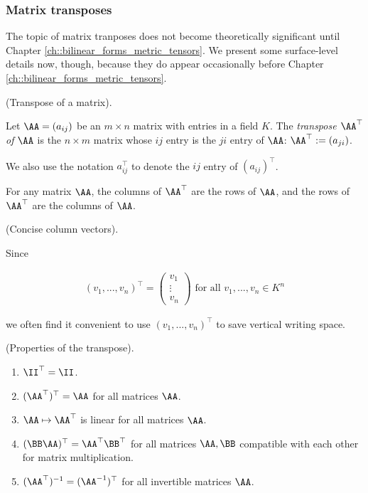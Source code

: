 \subsubsection{Matrix transposes}

The topic of matrix tranposes does not become theoretically significant until Chapter \ref{ch::bilinear_forms_metric_tensors}. We present some surface-level details now, though, because they do appear occasionally before Chapter \ref{ch::bilinear_forms_metric_tensors}.

\begin{defn}
    (Transpose of a matrix).

    Let $\AA = (a_{ij})$ be an $m \times n$ matrix with entries in a field $K$. The \textit{transpose $\AA^\top$ of $\AA$} is the $n \times m$ matrix whose $ij$ entry is the $ji$ entry of $\AA$: $\AA^\top := (a_{ji})$. 
    
    We also use the notation $a_{ij}^\top$ to denote the $ij$ entry of $(a_{ij})^\top$.

    For any matrix $\AA$, the columns of $\AA^\top$ are the rows of $\AA$, and the rows of $\AA^\top$ are the columns of $\AA$.
\end{defn}

\begin{remark}
    (Concise column vectors).

    Since

    \begin{align*}
        (v_1, ..., v_n)^\top =
        \begin{pmatrix}
            v_1 \\ \vdots \\ v_n
        \end{pmatrix} 
        \text{ for all $v_1, ..., v_n \in K^n$}
    \end{align*}

    we often find it convenient to use $(v_1, ..., v_n)^\top$ to save vertical writing space.
\end{remark}

\begin{theorem}
    (Properties of the transpose).

    \begin{enumerate}
        \item $\II^\top = \II$.
        \item $(\AA^\top)^\top = \AA$ for all matrices $\AA$.
        \item $\AA \mapsto \AA^\top$ is linear for all matrices $\AA$.
        \item $(\BB \AA)^\top = \AA^\top \BB^\top$ for all matrices $\AA, \BB$ compatible with each other for matrix multiplication.
        \item $(\AA^{\top})^{-1} = (\AA^{-1})^\top$ for all invertible matrices $\AA$.
    \end{enumerate}
\end{theorem}

